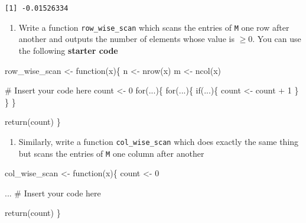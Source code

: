 \documentclass[
  letterpaper,
  DIV=11,
  numbers=noendperiod]{scrartcl}
\newenvironment{Shaded}{\begin{snugshade}}{\end{snugshade}}
\newcommand{\CommentTok}[1]{\textcolor[rgb]{0.37,0.37,0.37}{#1}}
\newcommand{\ControlFlowTok}[1]{\textcolor[rgb]{0.00,0.23,0.31}{#1}}
\newcommand{\DecValTok}[1]{\textcolor[rgb]{0.68,0.00,0.00}{#1}}
\newcommand{\FunctionTok}[1]{\textcolor[rgb]{0.28,0.35,0.67}{#1}}
\newcommand{\NormalTok}[1]{\textcolor[rgb]{0.00,0.23,0.31}{#1}}
\newcommand{\OtherTok}[1]{\textcolor[rgb]{0.00,0.23,0.31}{#1}}
\newcommand{\SpecialCharTok}[1]{\textcolor[rgb]{0.37,0.37,0.37}{#1}}
\providecommand{\tightlist}{%
  \setlength{\itemsep}{0pt}\setlength{\parskip}{0pt}}\usepackage{longtable,booktabs,array}
\begin{document}
\begin{verbatim}
[1] -0.01526334
\end{verbatim}

\begin{enumerate}
\def\labelenumi{\arabic{enumi}.}
\setcounter{enumi}{1}
\tightlist
\item
  Write a function \texttt{row\_wise\_scan} which scans the entries of
  \texttt{M} one row after another and outputs the number of elements
  whose value is \(\ge 0\). You can use the following \textbf{starter
  code}
\end{enumerate}

\begin{Shaded}
\begin{Highlighting}[]
\NormalTok{row\_wise\_scan }\OtherTok{\textless{}{-}} \ControlFlowTok{function}\NormalTok{(x)\{}
\NormalTok{    n }\OtherTok{\textless{}{-}} \FunctionTok{nrow}\NormalTok{(x)}
\NormalTok{    m }\OtherTok{\textless{}{-}} \FunctionTok{ncol}\NormalTok{(x)}

    \CommentTok{\# Insert your code here}
\NormalTok{    count }\OtherTok{\textless{}{-}} \DecValTok{0}
    \ControlFlowTok{for}\NormalTok{(...)\{}
        \ControlFlowTok{for}\NormalTok{(...)\{}
            \ControlFlowTok{if}\NormalTok{(...)\{}
\NormalTok{                count }\OtherTok{\textless{}{-}}\NormalTok{ count }\SpecialCharTok{+} \DecValTok{1} 
\NormalTok{            \}}
\NormalTok{        \}}
\NormalTok{    \}}

    \FunctionTok{return}\NormalTok{(count)}
\NormalTok{\}}
\end{Highlighting}
\end{Shaded}

\begin{enumerate}
\def\labelenumi{\arabic{enumi}.}
\setcounter{enumi}{2}
\tightlist
\item
  Similarly, write a function \texttt{col\_wise\_scan} which does
  exactly the same thing but scans the entries of \texttt{M} one column
  after another
\end{enumerate}

\begin{Shaded}
\begin{Highlighting}[]
\NormalTok{col\_wise\_scan }\OtherTok{\textless{}{-}} \ControlFlowTok{function}\NormalTok{(x)\{}
\NormalTok{    count }\OtherTok{\textless{}{-}} \DecValTok{0}
    
\NormalTok{    ... }\CommentTok{\# Insert your code here}

    \FunctionTok{return}\NormalTok{(count)}
\NormalTok{\}}
\end{Highlighting}
\end{Shaded}
\end{document}
